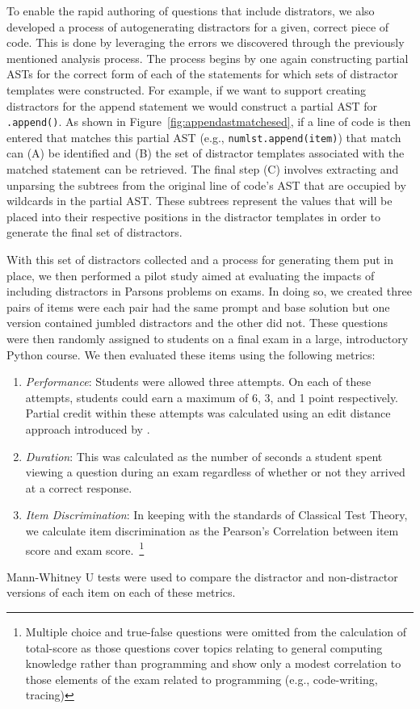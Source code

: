 \documentclass[authorversion,nonacm]{acmart}
\renewcommand{\boxed}[1]{\text{\fboxsep=.2em\fbox{#1}}}
\begin{document}
To enable the rapid authoring of questions that include distrators, we also 
developed a process of autogenerating distractors for a given, correct piece of code.
This is done by leveraging the errors we discovered through the previously
mentioned analysis process.  The process begins by one again constructing
partial ASTs for the correct form of each of the statements for which sets of
distractor templates were constructed.  For example, if we want to support
creating distractors for the append statement we would construct a partial AST
for \texttt{\boxed{1}.append(\boxed{2})}.  As shown in
Figure~\ref{fig:appendastmatchesed}, if a line of code is then entered that
matches this partial AST (e.g., \texttt{numlst.append(item)}) that match can
(A) be identified and (B) the set of distractor templates associated with the
matched statement can be retrieved. The final step (C) involves extracting and
unparsing the subtrees from the original line of code's AST that are occupied
by wildcards in the partial AST. These subtrees represent the values that will
be placed into their respective positions in the distractor templates in order
to generate the final set of distractors.

With this set of distractors collected and a process for generating them put in
place, we then performed a pilot study aimed at evaluating the impacts of including
distractors in Parsons problems on exams. In doing so, we created three pairs of items
were each pair had the same prompt and base solution but one version contained jumbled
distractors and the other did not. These questions were then randomly assigned to
students on a final exam in a large, introductory Python course.  We then
evaluated these items using the following metrics: 
\begin{enumerate}
    \item \textit{Performance}: Students were allowed three attempts. On each of these attempts, students could earn a maximum of 6, 3, and 1 point respectively. Partial credit within these attempts was calculated using an edit distance approach introduced by \citet{poulsen2022efficient}.
    \item \textit{Duration}: This was calculated as the number of seconds a student spent viewing a question during an exam regardless of whether or not they arrived at a correct response.
    \item \textit{Item Discrimination}: In keeping with the standards of Classical Test Theory, we calculate item discrimination as the Pearson's Correlation between item score and exam score.~\footnote{Multiple choice and true-false questions were omitted from the calculation of total-score as those questions cover topics relating to general computing knowledge rather than programming and show only a modest correlation to those elements of the exam related to programming (e.g., code-writing, tracing)}
\end{enumerate}
Mann-Whitney U tests were used to compare the distractor and non-distractor
versions of each item on each of these metrics.
\end{document}
